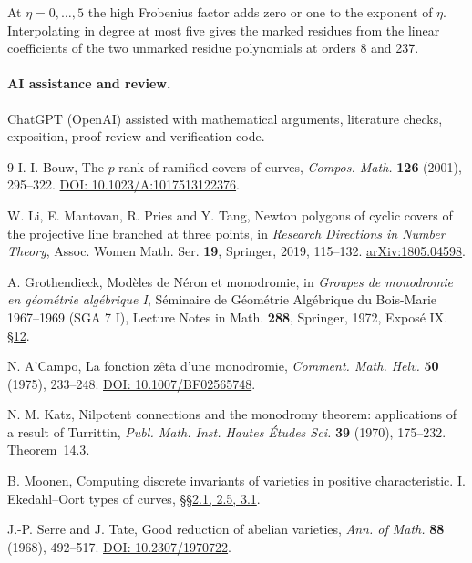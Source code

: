 \documentclass[11pt]{article}
\begin{document}
\begin{samepage}
At \(\eta=0,\ldots,5\) the high Frobenius factor adds zero or
one to the exponent of \(\eta\). Interpolating in degree at most
five gives the marked residues from the linear coefficients of
the two unmarked residue polynomials at orders 8 and 237.\par
\end{samepage}

\begin{samepage}
\paragraph{AI assistance and review.}
ChatGPT (OpenAI) assisted with mathematical arguments, literature checks,
exposition, proof review and verification code.

\begin{thebibliography}{9}
I. I. Bouw, The \(p\)-rank of ramified covers of curves,
\emph{Compos. Math.} \textbf{126} (2001), 295--322.
\href{https://doi.org/10.1023/A:1017513122376}{DOI: 10.1023/A:1017513122376}.

W. Li, E. Mantovan, R. Pries and Y. Tang, Newton polygons of cyclic
covers of the projective line branched at three points, in \emph{Research
Directions in Number Theory}, Assoc. Women Math. Ser. \textbf{19},
Springer, 2019, 115--132.
\href{https://arxiv.org/abs/1805.04598}{arXiv:1805.04598}.

A. Grothendieck, Mod\`eles de N\'eron et monodromie,
in \emph{Groupes de monodromie en g\'eom\'etrie alg\'ebrique I},
S\'eminaire de G\'eom\'etrie Alg\'ebrique du Bois-Marie 1967--1969 (SGA 7 I),
Lecture Notes in Math. \textbf{288}, Springer, 1972, Expos\'e IX.
\href{https://grothendiecksga.com/read/sga7/en/9-12.html}{\S12}.

N. A'Campo, La fonction z\^eta d'une monodromie,
\emph{Comment. Math. Helv.} \textbf{50} (1975), 233--248.
\href{https://doi.org/10.1007/BF02565748}{DOI: 10.1007/BF02565748}.

N. M. Katz, Nilpotent connections and the monodromy theorem:
applications of a result of Turrittin,
\emph{Publ. Math. Inst. Hautes \'Etudes Sci.} \textbf{39}
(1970), 175--232.
\href{https://web.math.princeton.edu/~nmk/old/nilpconn.pdf}{Theorem~14.3}.

B. Moonen, Computing discrete invariants of varieties in positive
characteristic. I. Ekedahl--Oort types of curves,
\href{https://www.math.ru.nl/~bmoonen/Papers/CDIPart1.pdf}{\S\S2.1, 2.5, 3.1}.

J.-P. Serre and J. Tate, Good reduction of abelian varieties,
\emph{Ann. of Math.} \textbf{88} (1968), 492--517.
\href{https://doi.org/10.2307/1970722}{DOI: 10.2307/1970722}.
\end{thebibliography}
\end{samepage}
\end{document}
